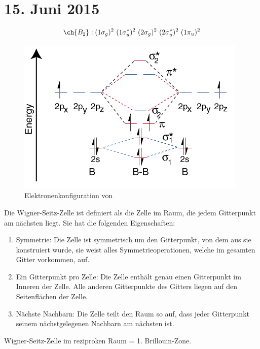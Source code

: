 \section{15. Juni 2015}

\label{q:31}

\[\ch{B_2} : (1\sigma_g)^2 ~ (1\sigma_u^*)^2 ~ (2\sigma_g)^2 ~ (2\sigma_u^*)^2 ~ (1\pi_u)^2\]

\begin{figure}[H]
    \centering
    \begin{samepage}
        \includegraphics[width=0.8\linewidth]{resources/15-06-2015/b2.PNG}
        \caption{Elektronenkonfiguration von }
    \end{samepage}
\end{figure}

\label{q:32}

\label{q:33}

Die Wigner-Seitz-Zelle ist definiert als die Zelle im Raum, die jedem Gitterpunkt am nächsten 
liegt. Sie hat die folgenden Eigenschaften:
\begin{enumerate}
    \item Symmetrie: Die Zelle ist symmetrisch um den Gitterpunkt, von dem aus sie konstruiert wurde, sie weist alles Symmetrieoperationen, welche im gesamten Gitter vorkommen, auf. 
    \item Ein Gitterpunkt pro Zelle: Die Zelle enthält genau einen Gitterpunkt im Inneren der Zelle. Alle anderen Gitterpunkte des Gitters liegen auf den Seitenflächen der Zelle.
    \item Nächste Nachbarn: Die Zelle teilt den Raum so auf, dass jeder Gitterpunkt seinem nächstgelegenen Nachbarn am nächsten ist. %
\end{enumerate}
Wigner-Seitz-Zelle im reziproken Raum = 1. Brillouin-Zone.

